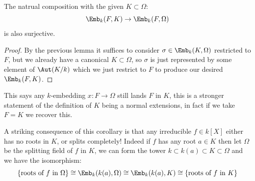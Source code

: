 \documentclass{article}
\begin{document}
\begin{corollary}
    The natrual composition with the given $K\subset\Omega$: \[
        \Emb_k(F,K)\rightarrow \Emb_k(F,\Omega)
    \] is also surjective.
    \begin{proof}
        By the previous lemma it suffices to consider $\sigma\in \Emb_k(K,\Omega)$ restricted to $F$, but we already have a canonical $K\subset\Omega$, so $\sigma$ is just represented by some element of $\Aut(K/k)$ which we just restrict to $F$ to produce our desired $\Emb_k(F,K)$.
    \end{proof}
\end{corollary}

This says any $k$-embedding $x:F\rightarrow \Omega$ still lands $F$ in $K$, this is a stronger statement of the definition of $K$ being a normal extensions, in fact if we take $F=K$ we recover this.

A striking consequence of this corollary is that any irreducible $f\in k[X]$ either has no roots in $K$, or splits completely! Indeed if $f$ has any root $a\in K$ then let $\Omega$ be the splitting field of $f$ in $K$, we can form the tower $k\subset k(a)\subset K \subset \Omega$ and we have the isomorphism: \[
    \{\text{roots of $f$ in $\Omega$}\} \cong \Emb_k(k(a),\Omega) \cong \Emb_k(k(a),K) \cong \{\text{roots of $f$ in $K$}\}
\] 
\end{document}
